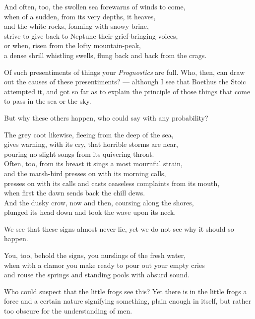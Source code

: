 And often, too, the swollen sea forewarns of winds to come, \\
when of a sudden, from its very depths, it heaves, \\
and the white rocks, foaming with snowy brine, \\
strive to give back to Neptune their grief-bringing voices, \\
or when, risen from the lofty mountain-peak, \\
a dense shrill whistling swells, flung back and back from the crags.

Of such presentiments of things your \textit{Prognostics} are full. Who, then, can draw out the causes of these presentiments? — although I see that Boethus the Stoic attempted it, and got so far as to explain the principle of those things that come to pass in the sea or the sky.

 But why these others happen, who could say with any probability?

The grey coot likewise, fleeing from the deep of the sea, \\
gives warning, with its cry, that horrible storms are near, \\
pouring no slight songs from its quivering throat. \\
Often, too, from its breast it sings a most mournful strain, \\
and the marsh-bird presses on with its morning calls, \\
presses on with its calls and casts ceaseless complaints from its mouth, \\
when first the dawn sends back the chill dews. \\
And the dusky crow, now and then, coursing along the shores, \\
plunged its head down and took the wave upon its neck.

 We see that these signs almost never lie, yet we do not see why it should so happen.

You, too, behold the signs, you nurslings of the fresh water, \\
when with a clamor you make ready to pour out your empty cries \\
and rouse the springs and standing pools with absurd sound.

Who could suspect that the little frogs see this? Yet there is in the little frogs a force and a certain nature signifying something, plain enough in itself, but rather too obscure for the understanding of men.

